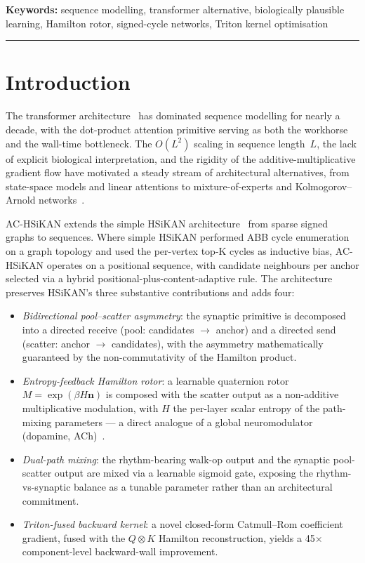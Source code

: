 \documentclass[11pt, a4paper]{article}
\begin{document}
\vspace{2mm}\noindent\textbf{Keywords:}
sequence modelling, transformer alternative, biologically plausible
learning, Hamilton rotor, signed-cycle networks, Triton kernel
optimisation
\vspace{4mm}\hrule\vspace{4mm}

\section{Introduction}
\label{sec:intro}

The transformer architecture~\cite{vaswani2017attention} has dominated
sequence modelling for nearly a decade, with the dot-product attention
primitive serving as both the workhorse and the wall-time bottleneck.
The $O(L^2)$ scaling in sequence length~$L$, the lack of explicit
biological interpretation, and the rigidity of the additive-multiplicative
gradient flow have motivated a steady stream of architectural alternatives,
from state-space models and linear attentions to mixture-of-experts and
Kolmogorov--Arnold networks~\cite{liu2024kan}.

AC-HSiKAN extends the simple HSiKAN architecture~\cite{hsikan2026internal}
from sparse signed graphs to sequences. Where simple HSiKAN performed
ABB cycle enumeration on a graph topology and used the per-vertex top-K
cycles as inductive bias, AC-HSiKAN operates on a positional sequence,
with candidate neighbours per anchor selected via a hybrid
positional-plus-content-adaptive rule. The architecture preserves
HSiKAN's three substantive contributions and adds four:

\begin{itemize}
\item \emph{Bidirectional pool--scatter asymmetry}: the synaptic primitive
      is decomposed into a directed receive (pool: candidates $\to$ anchor)
      and a directed send (scatter: anchor $\to$ candidates), with the
      asymmetry mathematically guaranteed by the non-commutativity of
      the Hamilton product.
\item \emph{Entropy-feedback Hamilton rotor}: a learnable quaternion
      rotor $M = \exp(\beta H \mathbf{n})$ is composed with the scatter
      output as a non-additive multiplicative modulation, with $H$ the
      per-layer scalar entropy of the path-mixing parameters --- a
      direct analogue of a global neuromodulator
      (dopamine, ACh)~\cite{schultz1997dopamine, fremaux2016three}.
\item \emph{Dual-path mixing}: the rhythm-bearing walk-op output and the
      synaptic pool-scatter output are mixed via a learnable sigmoid
      gate, exposing the rhythm-vs-synaptic balance as a tunable
      parameter rather than an architectural commitment.
\item \emph{Triton-fused backward kernel}: a novel closed-form
      Catmull--Rom coefficient gradient, fused with the $Q \otimes K$
      Hamilton reconstruction, yields a 45$\times$ component-level
      backward-wall improvement.
\end{itemize}
\end{document}
